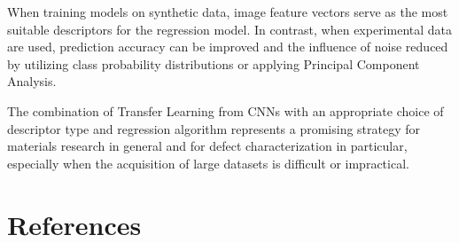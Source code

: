 \documentclass[10pt]{iopart}
\begin{document}
When training models on synthetic data, image feature vectors serve as the most suitable descriptors for the regression model. 
In contrast, when experimental data are used, prediction accuracy can be improved and the influence of noise reduced 
by utilizing class probability distributions or applying Principal Component Analysis.

The combination of Transfer Learning from CNNs with an appropriate choice of descriptor type 
and regression algorithm represents a promising strategy for materials research in general 
and for defect characterization in particular, 
especially when the acquisition of large datasets is difficult or impractical.

\section*{References}



\end{document}
